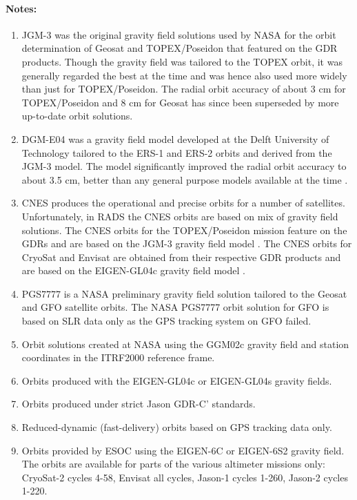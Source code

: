 \documentclass[a4paper,11pt,openany,natbib,nomargin]{thesis}
\newenvironment{notes}[1][Notes:]{\FloatBarrier\paragraph{#1}\begin{enumerate}}{\end{enumerate}}
\begin{document}
\begin{notes}
\item JGM-3 \citep{tapley1996} was the original gravity field solutions used by NASA for the orbit determination of Geosat and TOPEX/Poseidon that featured on the GDR products. Though the gravity field was tailored to the TOPEX orbit, it was generally regarded the best at the time and was hence also used more widely than just for TOPEX/Poseidon. The radial orbit accuracy of about 3 cm for TOPEX/Poseidon and 8 cm for Geosat has since been superseded by more up-to-date orbit solutions.\label{item:alt_jgm3}
\item DGM-E04 was a gravity field model developed at the Delft University of Technology tailored to the ERS-1 and ERS-2 orbits and derived from the JGM-3 model. The model significantly improved the radial orbit accuracy to about 3.5 cm, better than any general purpose models available at the time \citep{scharroo1998a}.\label{item:alt_dgme04}
\item CNES produces the operational and precise orbits for a number of satellites. Unfortunately, in RADS the CNES orbits are based on mix of gravity field solutions. The CNES orbits for the TOPEX/Poseidon mission feature on the GDRs and are based on the JGM-3 gravity field model \citep{tapley1996}. The CNES orbits for CryoSat and Envisat are obtained from their respective GDR products and are based on the EIGEN-GL04c gravity field model \citep{ablain2008}.\label{item:alt_cnes}
\item PGS7777 is a NASA preliminary gravity field solution tailored to the Geosat and GFO satellite orbits. The NASA PGS7777 orbit solution for GFO \citep{lemoine2006a} is based on SLR data only as the GPS tracking system on GFO failed.\label{item:alt_pgs7777}
\item Orbit solutions created at NASA using the GGM02c gravity field and station coordinates in the ITRF2000 reference frame.\label{item:alt_ggm02c}
\item Orbits produced with the EIGEN-GL04c or EIGEN-GL04s gravity fields.\label{item:alt_eiggl04s}
\item Orbits produced under strict Jason GDR-C' standards.\label{item:alt_gdrcp}
\item Reduced-dynamic (fast-delivery) orbits based on GPS tracking data only.\label{item:alt_gps}
\item Orbits provided by ESOC using the EIGEN-6C or EIGEN-6S2 gravity field. The orbits are available for parts of the various altimeter missions only: CryoSat-2 cycles 4-58, Envisat all cycles, Jason-1 cycles 1-260, Jason-2 cycles 1-220.\label{item:alt_eig6}

\end{notes}
\end{document}
